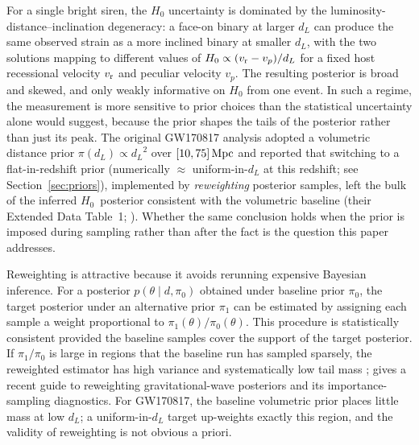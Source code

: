 \documentclass[usenatbib]{mnras}
\newcommand{\hzero}{\ensuremath{H_{0}}\xspace}
\newcommand{\dL}{\ensuremath{d_{L}}\xspace}
\begin{document}
For a single bright siren, the \hzero uncertainty is dominated by the luminosity-distance--inclination degeneracy: a face-on binary at larger \dL can produce the same observed strain as a more inclined binary at smaller \dL, with the two solutions mapping to different values of $\hzero \propto (v_{\rm r}-v_{p})/\dL$ for a fixed host recessional velocity $v_{\rm r}$ and peculiar velocity $v_{p}$. The resulting posterior is broad and skewed, and only weakly informative on \hzero from one event. In such a regime, the measurement is more sensitive to prior choices than the statistical uncertainty alone would suggest, because the prior shapes the tails of the posterior rather than just its peak. The original GW170817 analysis adopted a volumetric distance prior $\pi(\dL)\propto\dL^{2}$ over $[10,75]\,\rm Mpc$ and reported that switching to a flat-in-redshift prior (numerically ${\approx}$ uniform-in-$d_L$ at this redshift; see Section~\ref{sec:priors}), implemented by \emph{reweighting} posterior samples, left the bulk of the inferred \hzero\ posterior consistent with the volumetric baseline (their Extended Data Table~1; \citealp{Abbott2017H0}). Whether the same conclusion holds when the prior is imposed during sampling rather than after the fact is the question this paper addresses.

Reweighting is attractive because it avoids rerunning expensive Bayesian inference. For a posterior $p(\theta\mid d,\pi_{0})$ obtained under baseline prior $\pi_{0}$, the target posterior under an alternative prior $\pi_{1}$ can be estimated by assigning each sample a weight proportional to $\pi_{1}(\theta)/\pi_{0}(\theta)$. This procedure is statistically consistent provided the baseline samples cover the support of the target posterior. If $\pi_{1}/\pi_{0}$ is large in regions that the baseline run has sampled sparsely, the reweighted estimator has high variance and systematically low tail mass \citep[see e.g.][]{Speagle2020Dynesty}; \citet{Ashton2025Reweighting} gives a recent guide to reweighting gravitational-wave posteriors and its importance-sampling diagnostics. For GW170817, the baseline volumetric prior places little mass at low \dL; a uniform-in-$d_L$ target up-weights exactly this region, and the validity of reweighting is not obvious a priori.
\end{document}
